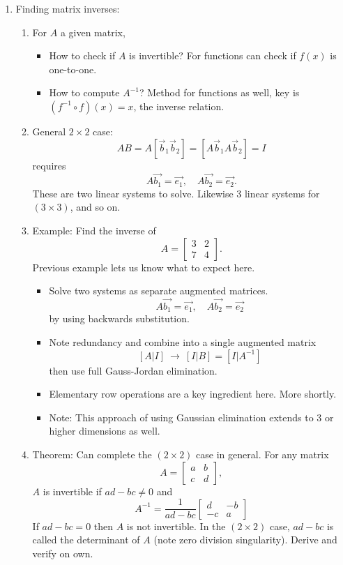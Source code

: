 \documentclass{article}
\begin{document}
\begin{enumerate}
\begin{enumerate}
\end{enumerate}

\item Finding matrix inverses:
\begin{enumerate}

\item For $A$ a given matrix, 
\begin{itemize}
\item How to check if $A$ is invertible? For functions can check if $f(x)$ is one-to-one.
\item How to compute $A^{-1}$? Method for functions as well, key is $(f^{-1} \circ f)(x)=x$, the inverse relation.
\end{itemize}

\item General $2 \times 2$ case:
\[
AB = A[\vec{b}_1 \vec{b}_2] = [A\vec{b}_1 A\vec{b}_2] = I
\]
requires
\[
A\vec{b_1} = \vec{e_1}, \quad A\vec{b_2} = \vec{e_2}.
\]
These are two linear systems to solve. Likewise 3 linear systems for $(3 \times 3)$, and so on.

\item Example: Find the inverse of 
\[
A = \left[
\begin{array}{cc}
3 & 2 \\
7 & 4
\end{array}
\right].
\]
Previous example lets us know what to expect here. 
\begin{itemize}
\item Solve two systems as separate augmented matrices.
\[
A\vec{b_1} = \vec{e_1}, \quad A\vec{b_2} = \vec{e_2}
\]
by using backwards substitution.

\item Note redundancy and combine into a single augmented matrix
\[
[A | I] ~ \rightarrow ~ [I | B]=[I | A^{-1}]
\]
then use full Gauss-Jordan elimination.

\item Elementary row operations are a key ingredient here. More shortly.

\item Note: This approach of using Gaussian elimination extends to 3 or higher dimensions as well.
\end{itemize}


\item Theorem: Can complete the $(2 \times 2)$ case in general. For any matrix 
\[
A = \left[
\begin{array}{cc}
a & b \\
c & d
\end{array}
\right],
\]
$A$ is invertible if $ad-bc \neq 0$ and
\[
A^{-1} = \frac{1}{ad-bc}\left[
\begin{array}{cc}
d & -b \\
-c & a
\end{array}
\right]
\]
If $ad-bc=0$ then $A$ is not invertible. In the $(2 \times 2)$ case, $ad-bc$ is called the determinant of $A$ (note zero division singularity). Derive and verify on own.



\end{enumerate}
\end{enumerate}
\end{document}
